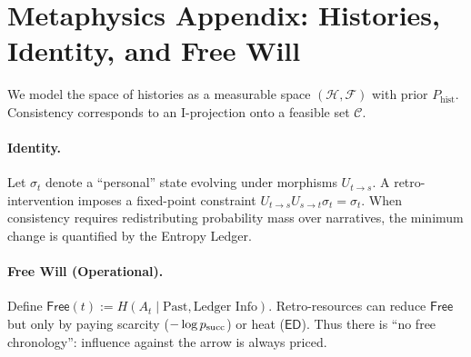 
\section{Metaphysics Appendix: Histories, Identity, and Free Will}
We model the space of histories as a measurable space $(\mathcal{H},\mathcal{F})$ with prior $P_{\text{hist}}$. Consistency corresponds to an I-projection onto a feasible set $\mathcal{C}$.

\paragraph{Identity.} Let $\sigma_t$ denote a ``personal'' state evolving under morphisms $U_{t\to s}$. A retro-intervention imposes a fixed-point constraint $U_{t\to s}U_{s\to t}\sigma_t=\sigma_t$. When consistency requires redistributing probability mass over narratives, the minimum change is quantified by the Entropy Ledger.

\paragraph{Free Will (Operational).} Define $\mathsf{Free}(t):=H(A_t\mid \text{Past},\text{Ledger Info})$. Retro-resources can reduce $\mathsf{Free}$ but only by paying scarcity ($-\log p_{\mathrm{succ}}$) or heat ($\mathsf{ED}$). Thus there is ``no free chronology'': influence against the arrow is always priced.

